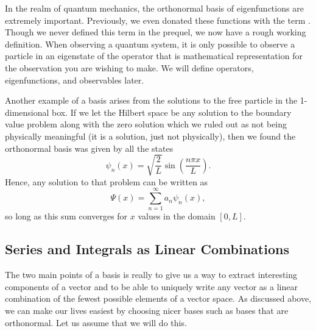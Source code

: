 In the realm of quantum mechanics, the orthonormal basis of eigenfunctions are extremely important. Previously, we even donated these functions with the term .  Though we never defined this term in the prequel, we now have a rough working definition.  When observing a quantum system, it is only possible to observe a particle in an eigenstate of the operator that is mathematical representation for the observation you are wishing to make.  We will define operators, eigenfunctions, and observables later.

Another example of a basis arises from the solutions to the free particle in the 1-dimensional box.  If we let the Hilbert space be any solution to the boundary value problem along with the zero solution which we ruled out as not being physically meaningful (it is a solution, just not physically), then we found the orthonormal basis was given by all the states
\[
\psi_n(x) = \sqrt{\frac{2}{L}}\sin\left(\frac{n\pi x}{L}\right).
\]
Hence, any solution to that problem can be written as
\[
\Psi(x) = \sum_{n=1}^\infty a_n \psi_n(x),
\]
so long as this sum converges for $x$ values in the domain $[0,L]$.

\subsection{Series and Integrals as Linear Combinations}

The two main points of a basis is really to give us a way to extract interesting components of a vector and to be able to uniquely write any vector as a linear combination of the fewest possible elements of a vector space.  As discussed above, we can make our lives easiest by choosing nicer bases such as bases that are orthonormal.  Let us assume that we will do this.

